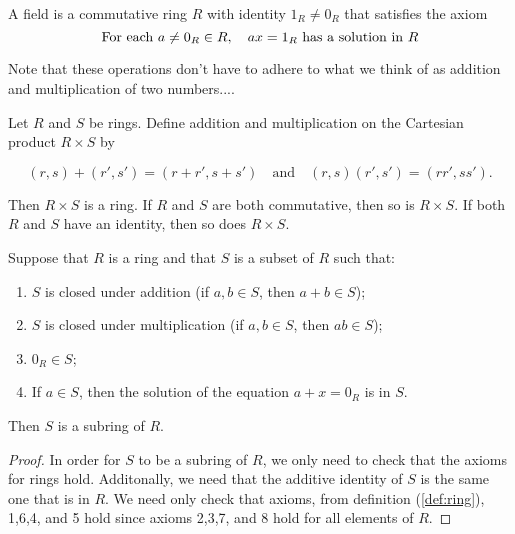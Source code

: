 \documentclass[../main.tex]{subfiles}
\begin{document}
\begin{definition}[Field]
A field is a commutative ring \(R\) with identity \(1_R \neq 0_R\) that satisfies the axiom 
\[
\textnormal{For each } a \neq 0_R \in R, \quad ax = 1_R \textnormal{ has a solution in \(R\)}
\]
\end{definition}


\begin{remark}
Note that these operations don't have to adhere to what we think of as addition and multiplication of two numbers....
\end{remark}



\begin{proposition}
Let $R$ and $S$ be rings. Define addition and multiplication on the Cartesian product $R \times S$ by

\[
(r, s) + (r', s') = (r + r', s + s') \quad \text{and} \quad (r, s)(r', s') = (rr', ss').
\]

Then $R \times S$ is a ring. If $R$ and $S$ are both commutative, then so is $R \times S$. If both $R$ and $S$ have an identity, then so does $R \times S$.
\end{proposition}





\begin{theorem}[Subring]
Suppose that $R$ is a ring and that $S$ is a subset of $R$ such that:
\begin{enumerate}
    \item $S$ is closed under addition (if $a, b \in S$, then $a + b \in S$);
    \item $S$ is closed under multiplication (if $a, b \in S$, then $ab \in S$);
    \item $0_R \in S$;
    \item If $a \in S$, then the solution of the equation $a + x = 0_R$ is in $S$.
\end{enumerate}
Then $S$ is a subring of $R$.
\end{theorem}

\begin{proof}
In order for $S$ to be a subring of $R$, we only need to check that the axioms for rings hold. 
Additonally, we need that the additive identity of $S$ is 
the same one that is in $R$. We need only check that 
axioms, from definition (\ref{def:ring}), 1,6,4, and 5 hold
since axioms 2,3,7, and 8 hold for all elements of $R$.
\end{proof}
\end{document}
